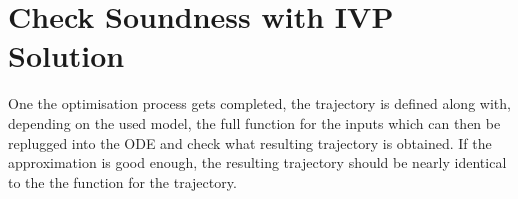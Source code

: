 \section{Check Soundness with IVP Solution}

\par One the optimisation process gets completed, the trajectory is defined along with, depending on the used model, the full function for the inputs which can then be replugged into the \ac{ODE} and check what resulting trajectory is obtained. If the approximation is good enough, the resulting trajectory should be nearly identical to the the function for the trajectory.



